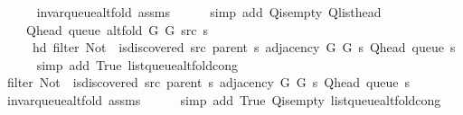 \begin{isabellebody}
\ \ \ \ \isamarkupfalse%
\ invar{\isacharunderscore}{\kern0pt}queue{\isacharunderscore}{\kern0pt}alt{\isacharunderscore}{\kern0pt}fold\ assms\isanewline
\ \ \ \ \isamarkupfalse%
\ {\isacharparenleft}{\kern0pt}simp\ add{\isacharcolon}{\kern0pt}\ Q{\isachardot}{\kern0pt}is{\isacharunderscore}{\kern0pt}empty\ Q{\isachardot}{\kern0pt}list{\isacharunderscore}{\kern0pt}head{\isacharparenright}{\kern0pt}\isanewline
\ \ \isamarkupfalse%
\isanewline
\ \ \ \ {\isachardoublequoteopen}Q{\isacharunderscore}{\kern0pt}head\ {\isacharparenleft}{\kern0pt}queue\ {\isacharparenleft}{\kern0pt}alt{\isacharunderscore}{\kern0pt}fold\ G{}\ G{}\ src\ s{\isacharparenright}{\kern0pt}{\isacharparenright}{\kern0pt}\ {\isacharequal}{\kern0pt}\isanewline
\ \ \ \ \ hd\ {\isacharparenleft}{\kern0pt}filter\ {\isacharparenleft}{\kern0pt}Not\ {\isasymcirc}\ is{\isacharunderscore}{\kern0pt}discovered\ src\ {\isacharparenleft}{\kern0pt}parent\ s{\isacharparenright}{\kern0pt}{\isacharparenright}{\kern0pt}\ {\isacharparenleft}{\kern0pt}adjacency\ G{}\ G{}\ s\ {\isacharparenleft}{\kern0pt}Q{\isacharunderscore}{\kern0pt}head\ {\isacharparenleft}{\kern0pt}queue\ s{\isacharparenright}{\kern0pt}{\isacharparenright}{\kern0pt}{\isacharparenright}{\kern0pt}{\isacharparenright}{\kern0pt}{\isachardoublequoteclose}\isanewline
\ \ \ \ \isamarkupfalse%
\ {\isacharparenleft}{\kern0pt}simp\ add{\isacharcolon}{\kern0pt}\ True\ list{\isacharunderscore}{\kern0pt}queue{\isacharunderscore}{\kern0pt}alt{\isacharunderscore}{\kern0pt}fold{\isacharunderscore}{\kern0pt}cong{\isacharparenright}{\kern0pt}\isanewline
\ \ \isamarkupfalse%
\ \isamarkupfalse%
\ {\isachardoublequoteopen}filter\ {\isacharparenleft}{\kern0pt}Not\ {\isasymcirc}\ is{\isacharunderscore}{\kern0pt}discovered\ src\ {\isacharparenleft}{\kern0pt}parent\ s{\isacharparenright}{\kern0pt}{\isacharparenright}{\kern0pt}\ {\isacharparenleft}{\kern0pt}adjacency\ G{}\ G{}\ s\ {\isacharparenleft}{\kern0pt}Q{\isacharunderscore}{\kern0pt}head\ {\isacharparenleft}{\kern0pt}queue\ s{\isacharparenright}{\kern0pt}{\isacharparenright}{\kern0pt}{\isacharparenright}{\kern0pt}\ {\isasymnoteq}\ {\isacharbrackleft}{\kern0pt}{\isacharbrackright}{\kern0pt}{\isachardoublequoteclose}\isanewline
\ \ \ \ \isamarkupfalse%
\ invar{\isacharunderscore}{\kern0pt}queue{\isacharunderscore}{\kern0pt}alt{\isacharunderscore}{\kern0pt}fold\ assms\isanewline
\ \ \ \ \isamarkupfalse%
\ {\isacharparenleft}{\kern0pt}simp\ add{\isacharcolon}{\kern0pt}\ True\ Q{\isachardot}{\kern0pt}is{\isacharunderscore}{\kern0pt}empty\ list{\isacharunderscore}{\kern0pt}queue{\isacharunderscore}{\kern0pt}alt{\isacharunderscore}{\kern0pt}fold{\isacharunderscore}{\kern0pt}cong{\isacharparenright}{\kern0pt}\isanewline

\end{isabellebody}
